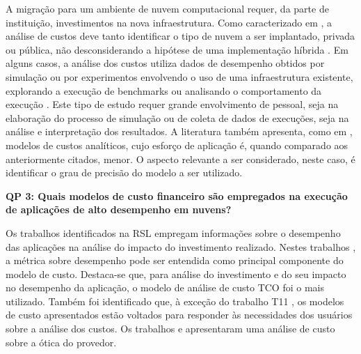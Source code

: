 \documentclass[tese,capa]{texufpel}
\begin{document}
A migração para um ambiente de nuvem computacional requer, da parte de instituição, investimentos na nova infraestrutura. Como caracterizado em \cite{dreherCostAnalysisComparing2017e, guerreroPerformanceCostModel2014b}, a análise de custos deve tanto identificar o tipo de nuvem a ser implantado, privada ou pública, não desconsiderando a hipótese de uma implementação híbrida \cite{guptaEvaluatingImprovingPerformance2016d, sadooghiUnderstandingPerformancePotential2017d}. Em alguns casos, a análise dos custos utiliza dados de desempenho obtidos por simulação \cite{shenCostOptimizedResourceProvision2014b, guptaEvaluatingImprovingPerformance2016d, arabnejadSchedulingDeadlineConstrained2017c} ou por experimentos envolvendo o uso de uma infraestrutura existente, explorando a execução de benchmarks \cite{roloffHighPerformanceComputing2012c, maratheComparativeStudyHighperformance2013c, guptaEvaluatingImprovingPerformance2016d, prukkantragornPriceEfficiencyHigh2016b, roloffHPCApplicationPerformance2017c, sadooghiUnderstandingPerformancePotential2017d, emerasAmazonElasticCompute2019c, roloffExploringInstanceHeterogeneity2019a} ou analisando o comportamento da execução \cite{maratheComparativeStudyHighperformance2013c, arabnejadSchedulingDeadlineConstrained2017c}. Este tipo de estudo requer grande envolvimento de pessoal, seja na elaboração do processo de simulação ou de coleta de dados de execuções, seja na análise e interpretação dos resultados. A literatura também apresenta, como em \cite{roloffHighPerformanceComputing2012c, maratheComparativeStudyHighperformance2013c, guerreroPerformanceCostModel2014b, shenCostOptimizedResourceProvision2014b, prukkantragornPriceEfficiencyHigh2016b, dreherCostAnalysisComparing2017e, sadooghiUnderstandingPerformancePotential2017d, emerasAmazonElasticCompute2019c}, modelos de custos analíticos, cujo esforço de aplicação é, quando comparado aos anteriormente citados, menor. O aspecto relevante a ser considerado, neste caso, é identificar o grau de precisão do modelo a ser utilizado.

\textbf{QP 3: Quais modelos de custo financeiro são empregados na execução de aplicações de alto desempenho em nuvens?}

Os trabalhos identificados na RSL empregam informações sobre o desempenho das aplicações na análise do impacto do investimento realizado. Nestes trabalhos \cite{roloffHighPerformanceComputing2012c, maratheComparativeStudyHighperformance2013c, guptaEvaluatingImprovingPerformance2016d, roloffHPCApplicationPerformance2017c, sadooghiUnderstandingPerformancePotential2017d, prukkantragornPriceEfficiencyHigh2016b, emerasAmazonElasticCompute2019c}, a métrica sobre desempenho pode ser entendida como principal componente do modelo de custo. Destaca-se que, para análise do investimento e do seu impacto no desempenho da aplicação, o modelo de análise de custo TCO foi o mais utilizado. Também foi identificado que, à exceção do trabalho T11 \cite{emerasAmazonElasticCompute2019c}, os modelos de custo apresentados estão voltados para responder às necessidades dos usuários sobre a análise dos custos. Os trabalhos \cite{shenCostOptimizedResourceProvision2014b} e \cite{guptaEvaluatingImprovingPerformance2016d} apresentaram uma análise de custo sobre a ótica do provedor.
\end{document}
